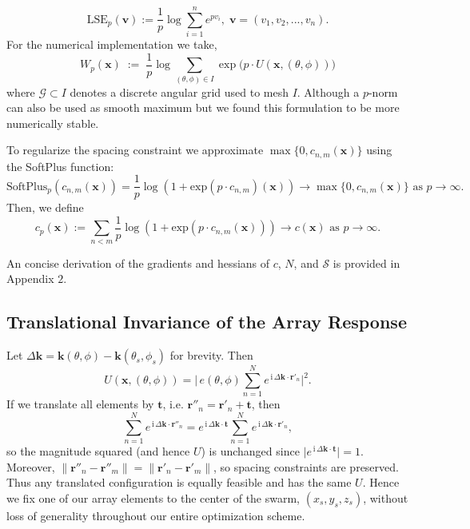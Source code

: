 \documentclass[11pt,letterpaper]{article}
\theoremstyle{definition}
\theoremstyle{plain}
\begin{document}
\[
\text{LSE}_p(\mathbf{v}) := \frac{1}{p} \log\sum_{i=1}^n e^{p v_i}, \;\mathbf v = (v_1,v_2,..., v_n) . 
\]
For the numerical implementation we take,
\[
W_p(\mathbf{x}) \;:=\; \frac{1}{p}\log\!\sum_{(\theta,\phi)\in I}
\exp\!\Big( p\cdot U(\mathbf{x},(\theta,\phi))\Big)
\]
where \(\mathcal G\subset I\) denotes a discrete angular grid used to mesh $I$. Although a $p$-norm can also be used as smooth maximum but we found this formulation to be more numerically stable.

To regularize the spacing constraint we approximate $\max\{0, c_{n,m}(\mathbf{x})\}$ using the SoftPlus function:
\[
\text{SoftPlus}_p(c_{n,m}(\mathbf{x})) = \frac{1}{p}\log(1+\text{exp}(p\cdot c_{n,m})(\mathbf{x})) \to\max\{0, c_{n,m}(\mathbf{x})\} \text{ as } p\to \infty.
\]
Then, we define
\begin{equation}
c_p(\mathbf{x}) := \sum_{n < m} \frac{1}{p} \log ( 1+ \text{exp}(p\cdot c_{n,m}(\mathbf{x})) ) \to c(\mathbf{x}) \text{ as } p \to \infty.
\end{equation}

An concise derivation of the gradients and hessians of $c$, $N$, and $\mathcal{S}$ is provided in Appendix $2$.






\subsection{Translational Invariance of the Array Response}
\label{sec:TranInv}
Let $\Delta\mathbf{k}=\mathbf{k}(\theta,\phi)-\mathbf{k}(\theta_s,\phi_s)$ for brevity.
Then
\[
U(\mathbf{x},(\theta,\phi))=\Big|\,e(\theta,\phi)\sum_{n=1}^N
e^{\,\mathrm{i}\,\Delta\mathbf{k}\cdot \mathbf{r}'_n}\Big|^2.
\]
If we translate all elements by $\mathbf{t}$, i.e. $\mathbf{r}''_n=\mathbf{r}'_n+\mathbf{t}$, then
\[
\sum_{n=1}^N e^{\,\mathrm{i}\,\Delta\mathbf{k}\cdot \mathbf{r}''_n}
= e^{\,\mathrm{i}\,\Delta\mathbf{k}\cdot \mathbf{t}}\sum_{n=1}^N e^{\,\mathrm{i}\,\Delta\mathbf{k}\cdot \mathbf{r}'_n},
\]
so the magnitude squared (and hence $U$) is unchanged since $\big|e^{\,\mathrm{i}\,\Delta\mathbf{k}\cdot \mathbf{t}}\big|=1$.
Moreover, $\|\mathbf{r}''_n-\mathbf{r}''_m\|=\|\mathbf{r}'_n-\mathbf{r}'_m\|$, so spacing constraints are preserved.
Thus any translated configuration is equally feasible and has the same $U$. Hence we fix one of our array elements to the center of the swarm, $(x_s, y_s, z_s)$, without loss of generality throughout our entire optimization scheme. 
\end{document}
